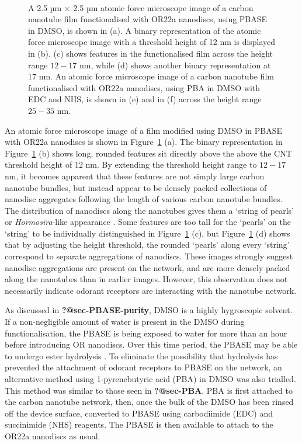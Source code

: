 \documentclass[
  a4paper,
]{scrbook}
\begin{document}
\begin{figure}
\begin{minipage}[t]{0.01\linewidth}
{\centering 

~

}

\end{minipage}%

\caption{\label{fig-DMSO-AFM-comparison}A 2.5 µm \(\times\) 2.5 µm
atomic force microscope image of a carbon nanotube film functionalised
with OR22a nanodiscs, using PBASE in DMSO, is shown in (a). A binary
representation of the atomic force microscope image with a threshold
height of 12 nm is displayed in (b). (c) shows features in the
functionalised film across the height range \(12-17\) nm, while (d)
shows another binary representation at 17 nm. An atomic force microscope
image of a carbon nanotube film functionalised with OR22a nanodiscs,
using PBA in DMSO with EDC and NHS, is shown in (e) and in (f) across
the height range \(25-35\) nm.}

\end{figure}

An atomic force microscope image of a film modified using DMSO in PBASE
with OR22a nanodiscs is shown in Figure~\ref{fig-DMSO-AFM-comparison}
(a). The binary representation in Figure~\ref{fig-DMSO-AFM-comparison}
(b) shows long, rounded features sit directly above the above the CNT
threshold height of 12 nm. By extending the threshold height range to
\(12-17\) nm, it becomes apparent that these features are not simply
large carbon nanotube bundles, but instead appear to be densely packed
collections of nanodisc aggregates following the length of various
carbon nanotube bundles. The distribution of nanodiscs along the
nanotubes gives them a `string of pearls' or \emph{Hormosira}-like
appearance \autocite{NewZealandPlantConservationNetwork}. Some features
are too tall for the `pearls' on the `string' to be individually
distinguished in Figure~\ref{fig-DMSO-AFM-comparison} (c), but
Figure~\ref{fig-DMSO-AFM-comparison} (d) shows that by adjusting the
height threshold, the rounded `pearls' along every `string' correspond
to separate aggregations of nanodiscs. These images strongly suggest
nanodisc aggregations are present on the network, and are more densely
packed along the nanotubes than in earlier images. However, this
observation does not necessarily indicate odorant receptors are
interacting with the nanotube network.

As discussed in \textbf{?@sec-PBASE-purity}, DMSO is a highly
hygroscopic solvent. If a non-negligible amount of water is present in
the DMSO during functionalisation, the PBASE is being exposed to water
for more than an hour before introducing OR nanodiscs. Over this time
period, the PBASE may be able to undergo ester hydrolysis
\autocite{Hermanson2013-3}. To eliminate the possibility that hydrolysis
has prevented the attachment of odorant receptors to PBASE on the
network, an alternative method using 1-pyrenebutyric acid (PBA) in DMSO
was also trialled. This method was similar to those seen in
\textbf{?@sec-PBA}. PBA is first attached to the carbon nanotube
network, then, once the bulk of the DMSO has been rinsed off the device
surface, converted to PBASE using carbodiimide (EDC) and succinimide
(NHS) reagents. The PBASE is then available to attach to the OR22a
nanodiscs as usual.
\end{document}
